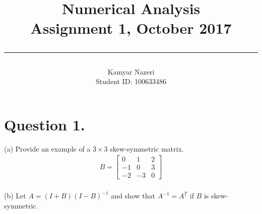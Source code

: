 \documentclass[a4paper,11pt]{article}
\begin{document}
\title{
	\Huge \textbf {Numerical Analysis}
    \\ [0.2cm]
	\LARGE Assignment 1, October 2017
    \\ [0.5cm]
    \hrule
}

\date{}

\author{
		\Large Kamyar Nazeri \\
		\large Student ID: 100633486 }

\maketitle

\newpage

\section*{Question 1.}
(a) Provide an example of a $3 \times 3$ skew-symmetric matrix.
\begin{align*}
B = \begin{bmatrix}
       0 & 1 & 2 \\
       -1 & 0 & 3 \\
       -2 & -3 & 0
     \end{bmatrix}
\end{align*}
\\
(b) Let $A=(I+B)(I-B)^{-1}$ and show that $A^{-1}=A^{T}$ if $B$ is skew-symmetric.
\\
\end{document}
